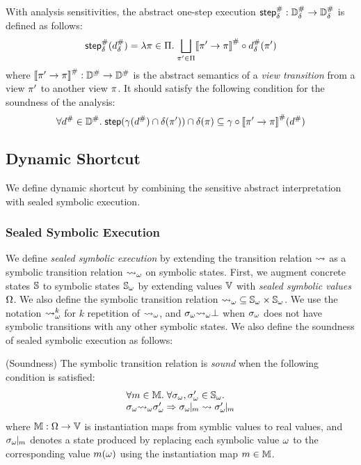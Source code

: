 With analysis sensitivities, the abstract one-step execution ${\textsf{step}}^{\#}_\delta:
{\mathbb{D}}^{\#}_\delta \rightarrow {\mathbb{D}}^{\#}_\delta$ is defined as follows:
\[
  {\textsf{step}}^{\#}_\delta({d}^{\#}_\delta) = \lambda \pi \in \Pi. \; \underset{\pi' \in
  \Pi}{\bigsqcup}{{[\![{\pi' \rightarrow \pi}]\!]}^{\#} \circ {d}^{\#}_\delta(\pi')}
\]
where ${[\![{\pi' \rightarrow \pi}]\!]}^{\#}: {\mathbb{D}}^{\#} \rightarrow {\mathbb{D}}^{\#}$ is the abstract
semantics of a \textit{view transition} from a view $\pi'$ to another view
$\pi$.  It should satisfy the following condition for the soundness of the
analysis:
\[
  \forall {d}^{\#} \in {\mathbb{D}}^{\#}. \; \textsf{step}(\gamma({d}^{\#}) \cap \delta(\pi'))
  \cap \delta(\pi) \subseteq \gamma \circ
  {[\![{\pi' \rightarrow \pi}]\!]}^{\#}({d}^{\#})
\]



\subsection{Dynamic Shortcut}

We define dynamic shortcut by combining the sensitive abstract interpretation
with sealed symbolic execution.


\subsubsection{Sealed Symbolic Execution}

We define \textit{sealed symbolic execution} by extending the transition
relation $\leadsto$ as a symbolic transition relation ${\leadsto}_\omega$ on symbolic
states.  First, we augment concrete states $\mathbb{S}$ to symbolic states
${\mathbb{S}}_\omega$ by extending values $\mathbb{V}$ with \textit{sealed symbolic values}
$\Omega$.  We also define the symbolic transition relation ${\leadsto}_\omega
\subseteq {\mathbb{S}}_\omega \times {\mathbb{S}}_\omega$. We use the notation ${\leadsto}_\omega^k$
for $k$ repetition of ${\leadsto}_\omega$, and  ${\sigma}_\omega {\leadsto}_\omega \bot$ when
${\sigma}_\omega$ does not have symbolic transitions with any other symbolic states.  We
also define the soundness of sealed symbolic execution as follows:
\begin{definition}{(Soundness)}
  The symbolic transition relation is \textit{sound} when the following
  condition is satisfied:
  \[
    \begin{array}{l}
      \forall \imap \in \imapset. \; \forall \symbst, \symbst' \in \symbstset.\\
      \symbst \symbtrans \symbst' \Rightarrow \instant{\symbst}{\imap} \trans
      \instant{\symbst'}{\imap}
    \end{array}
  \]
  where $\mathbb{M}: \Omega \rightarrow \mathbb{V}$ is instantiation maps from
  symblic values to real values, and ${\sigma}_\omega\!\!\mid\!\!_{m}$ denotes a state
  produced by replacing each symbolic value $\omega$ to the corresponding value
  $m(\omega)$ using the instantiation map $m \in \mathbb{M}$.
\end{definition}

